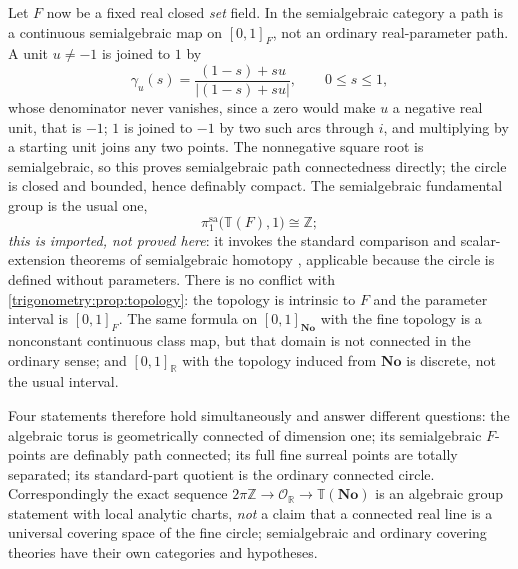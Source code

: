 \documentclass[11pt,letterpaper]{article}
\numberwithin{equation}{section}
\theoremstyle{definition}
\theoremstyle{remark}
\newcommand{\No}{\mathbf{No}}
\newcommand{\R}{\mathbb R}
\newcommand{\Z}{\mathbb Z}
\newcommand{\OO}{\mathcal O}
\newcommand{\TT}{\mathbb T}
\begin{document}
Let $F$ now be a fixed real closed \emph{set} field. In the semialgebraic category a path is a
continuous semialgebraic map on $[0,1]_F$, not an ordinary real-parameter path. A unit $u\ne-1$ is
joined to $1$ by
\begin{equation}\label{trigonometry:rot:eq:semipath}
 \gamma_u(s)=\frac{(1-s)+su}{|(1-s)+su|},\qquad0\le s\le1,
\end{equation}
whose denominator never vanishes, since a zero would make $u$ a negative real unit, that is $-1$;
$1$ is joined to $-1$ by two such arcs through $i$, and multiplying by a starting unit joins any two
points. The nonnegative square root is semialgebraic, so this proves semialgebraic path
connectedness directly; the circle is closed and bounded, hence definably compact. The semialgebraic
fundamental group is the usual one,
\begin{equation}\label{trigonometry:rot:eq:sapi}
 \pi_1^{\mathrm{sa}}\bigl(\TT(F),1\bigr)\cong\Z;
\end{equation}
\emph{this is imported, not proved here}: it invokes the standard comparison and scalar-extension
theorems of semialgebraic homotopy \cite{DK,BaroOtero}, applicable because the circle is defined
without parameters. There is no conflict with \cref{trigonometry:prop:topology}: the topology is
intrinsic to $F$ and the parameter interval is $[0,1]_F$. The same formula on $[0,1]_{\No}$ with the
fine topology is a nonconstant continuous class map, but that domain is not connected in the ordinary
sense; and $[0,1]_{\R}$ with the topology induced from $\No$ is discrete, not the usual interval.

Four statements therefore hold simultaneously and answer different questions: the algebraic torus is
geometrically connected of dimension one; its semialgebraic $F$-points are definably path connected;
its full fine surreal points are totally separated; its standard-part quotient is the ordinary
connected circle. Correspondingly the exact sequence $2\pi\Z\to\OO_{\R}\to\TT(\No)$ is an algebraic
group statement with local analytic charts, \emph{not} a claim that a connected real line is a
universal covering space of the fine circle; semialgebraic and ordinary covering theories have their
own categories and hypotheses.
\end{document}
